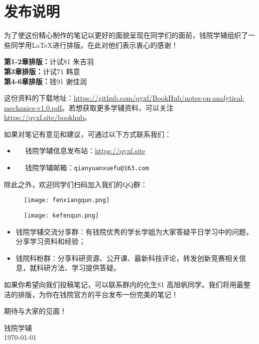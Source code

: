 \chapter*{发布说明}

为了使这份精心制作的笔记以更好的面貌呈现在同学们的面前，钱院学辅组织了一些同学用\LaTeX 进行排版。在此对他们表示衷心的感谢！
\vspace{0.5em}

\begin{tcolorbox}[title={\bfseries 参与排版成员}]
	 \textbf{第1-2章排版：}计试81 朱吉羽\\
	 \textbf{第3章排版：}计试71 韩意\\
	 \textbf{第4-6章排版：}钱91 谢佳润
\end{tcolorbox}

这份资料的下载地址：\url{https://github.com/qyxf/BookHub/notes-on-analytical-mechanics-v1.0.pdf}。若想获取更多学辅资料，可以关注\url{https://qyxf.site/bookhub}。

如果对笔记有意见和建议，可通过以下方式联系我们：

\begin{itemize}
	\item \faInternetExplorer ~~ 钱院学辅信息发布站：\url{https://qyxf.site}
	\item \faEnvelopeOpen ~~ 钱院学辅邮箱：\texttt{qianyuanxuefu@163.com}
\end{itemize}

除此之外，欢迎同学们扫码加入我们的QQ群：

\begin{figure}[!ht]
	\centering
	\begin{minipage}[c]{0.45\textwidth}
		\centering
		\texttt{[image: fenxiangqun.png]}
	\end{minipage}%
	\quad
	\begin{minipage}[c]{0.45\textwidth}
		\centering
		\texttt{[image: kefenqun.png]}
	\end{minipage}
\end{figure}

\newpage\thispagestyle{empty}

\begin{itemize}
	\item 钱院学辅交流分享群：有钱院优秀的学长学姐为大家答疑平日学习中的问题，分享学习资料和经验；
	\item 钱院科粉群：分享科研资源、公开课、最新科技评论，转发创新竞赛相关信息，就科研方法、学习提供答疑。
\end{itemize}

如果你希望向我们投稿笔记，可以联系群内的化生81 高旭帆同学。我们将用最整洁的排版，为你在钱院官方的平台发布一份完美的笔记！

期待与大家的见面！

\begin{flushright}
	钱院学辅\\
	\today
\end{flushright}

